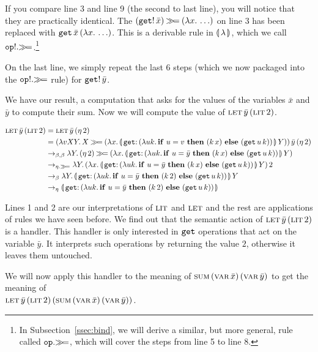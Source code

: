 If you compare line 3 and line 9 (the second to last line), you will notice
that they are practically identical. The
$(\mathtt{get}!\,\bar{x}) \mathbin{\gg\!=} (\lambda x.\, \ldots)$ on line 3 has been
replaced with $\mathtt{get}\,\bar{x}\,(\lambda x.\, \ldots)$. This is a
derivable rule in ${\llparenthesis \, \lambda \, \rrparenthesis}$, which we call $\mathtt{op}!.\mathbin{\gg\!=}$.\footnote{In
  Subsection~\ref{ssec:bind}, we will derive a similar, but more general,
  rule called $\mathtt{op}.\mathbin{\gg\!=}$, which will cover the steps from line 5 to
  line 8.}

On the last line, we simply repeat the last 6 steps (which we now packaged
into the $\mathtt{op}!.\mathbin{\gg\!=}$ rule) for $\mathtt{get}!\,\bar{y}$.

We have our result, a computation that asks for the values of the variables
$\bar{x}$ and $\bar{y}$ to compute their sum. Now we will compute the value
of $\textsc{let}\,\bar{y}\,(\textsc{lit}\,2)$.

\NoChapterPrefix
\begin{align}
  \app{\lete}{\bar{y}}{\litec{2}}
&= \app{\lete}{\bar{y}}{(\ap{\eta}{2})} \\
&= \appp{(\lam{v X Y}{X \hsbind (\lam{x}{\ap{\banana{\onto{\op{get}} {(\lam{u k}{\ifte{u = v}{(\ap{k}{x})} {(\app{\op{get}}{u}{k})}})}}}{Y}})})} {\bar{y}}{(\ap{\eta}{2})} \\
&\to_{\beta,\beta} \lam{Y}{(\ap{\eta}{2}) \hsbind (\lam{x}{\ap{\banana{\onto{\op{get}}{(\lam{u k}{\ifte{u = \bar{y}}{(\ap{k}{x})}{(\app{\op{get}}{u}{k})}})}}}{Y}})} \\
&\to_{\eta.\hsbind} \lam{Y}{\ap{(\lam{x}{\ap{\banana{\onto{\op{get}}{(\lam{u k}{\ifte{u = \bar{y}}{(\ap{k}{x})}{(\app{\op{get}}{u}{k})}})}}}{Y}})}{2}} \\
&\to_{\beta} \lam{Y}{\ap{\banana{\onto{\op{get}}{(\lam{u k}{\ifte{u = \bar{y}}{(\ap{k}{2})}{(\app{\op{get}}{u}{k})}})}}}{Y}} \\
&\to_{\eta} \banana{\onto{\op{get}}{(\lam{u k}{\ifte{u = \bar{y}}{(\ap{k}{2})}{(\app{\op{get}}{u}{k})}})}}
\end{align}
\setcounter{equation}{0}
\ChapterPrefix

Lines 1 and 2 are our interpretations of $\textsc{lit}$ and $\textsc{let}$ and the rest
are applications of rules we have seen before. We find out that the
semantic action of $\textsc{let}\,\bar{y}\,(\textsc{lit}\,2)$ is a handler. This
handler is only interested in $\mathtt{get}$ operations that act on the
variable $\bar{y}$. It interprets such operations by returning the value
$2$, otherwise it leaves them untouched.

We will now apply this handler to the meaning of
$\textsc{sum}\,(\textsc{var}\,\bar{x})\,(\textsc{var}\,\bar{y})$ to get the meaning of \\
$\textsc{let}\,\bar{y}\,(\textsc{lit}\,2)\,(\textsc{sum}\,(\textsc{var}\,\bar{x})\,(\textsc{var}\,\bar{y}))$.

